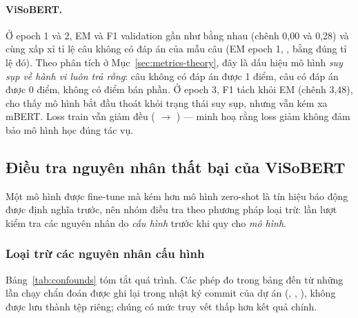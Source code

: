 \paragraph{ViSoBERT.} Ở epoch 1 và 2, EM và F1 validation gần như bằng nhau (chênh 0,00 và 0,28)
và cùng xấp xỉ tỉ lệ câu không có đáp án của mẫu \overlapSelN{} câu (EM epoch 1, \curveVisoValEMI, bằng đúng tỉ lệ đó). Theo phân tích ở
Mục~\ref{sec:metrics-theory}, đây là dấu hiệu mô hình \emph{suy sụp về hành vi luôn trả rỗng}:
câu không có đáp án được 1 điểm, câu có đáp án được 0 điểm, không có điểm bán phần. Ở epoch 3,
F1 tách khỏi EM (chênh 3,48), cho thấy mô hình bắt đầu thoát khỏi trạng thái suy sụp, nhưng vẫn
kém xa mBERT. Loss train vẫn giảm đều (\curveVisoLossI{} $\to$ \curveVisoLossIII) --- minh hoạ rằng loss giảm không
đảm bảo mô hình học đúng tác vụ.

\subsection{Điều tra nguyên nhân thất bại của ViSoBERT}
\label{sec:visobert-analysis}

Một mô hình được fine-tune mà kém hơn mô hình zero-shot là tín hiệu báo động được định nghĩa
trước, nên nhóm điều tra theo phương pháp loại trừ: lần lượt kiểm tra các nguyên nhân do
\emph{cấu hình} trước khi quy cho \emph{mô hình}.

\subsubsection{Loại trừ các nguyên nhân cấu hình}

Bảng~\ref{tab:confounds} tóm tắt quá trình. Các phép đo trong bảng đến từ những lần chạy chẩn
đoán được ghi lại trong nhật ký commit của dự án (, , ),
không được lưu thành tệp  riêng; chúng có mức truy vết thấp hơn kết quả chính.

